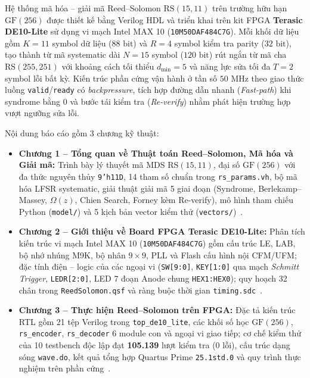 \documentclass[11pt,a4paper]{report}
\begin{document}
Hệ thống mã hóa -- giải mã Reed--Solomon $\text{RS}(15,11)$ trên trường hữu hạn $\text{GF}(256)$ được thiết kế bằng Verilog HDL và triển khai trên kit FPGA \textbf{Terasic DE10-Lite} sử dụng vi mạch Intel MAX 10 (\texttt{10M50DAF484C7G}). Mỗi khối dữ liệu gồm $K = 11$ symbol dữ liệu ($88\text{ bit}$) và $R = 4$ symbol kiểm tra parity ($32\text{ bit}$), tạo thành từ mã systematic dài $N = 15$ symbol ($120\text{ bit}$) rút ngắn từ mã cha $\text{RS}(255,251)$ với khoảng cách tối thiểu $d_{\min} = 5$ và năng lực sửa tối đa $T = 2$ symbol lỗi bất kỳ. Kiến trúc phần cứng vận hành ở tần số $50\text{ MHz}$ theo giao thức luồng \texttt{valid}/\texttt{ready} có \textit{backpressure}, tích hợp đường dẫn nhanh (\textit{Fast-path}) khi syndrome bằng 0 và bước tái kiểm tra (\textit{Re-verify}) nhằm phát hiện trường hợp vượt ngưỡng sửa lỗi.

Nội dung báo cáo gồm 3 chương kỹ thuật:
\begin{itemize}
    \item \textbf{Chương 1 -- Tổng quan về Thuật toán Reed--Solomon, Mã hóa và Giải mã:} Trình bày lý thuyết mã MDS $\text{RS}(15,11)$, đại số $\text{GF}(256)$ với đa thức nguyên thủy \texttt{9'h11D}, 14 tham số chuẩn trong \texttt{rs\_params.vh}, bộ mã hóa LFSR systematic, giải thuật giải mã 5 giai đoạn (Syndrome, Berlekamp--Massey, $\Omega(z)$, Chien Search, Forney kèm Re-verify), mô hình tham chiếu Python (\texttt{model/}) và 5 kịch bản vector kiểm thử (\texttt{vectors/})~\cite{reed1960,lincostello2004,morelos2006}.
    \item \textbf{Chương 2 -- Giới thiệu về Board FPGA Terasic DE10-Lite:} Phân tích kiến trúc vi mạch Intel MAX 10 (\texttt{10M50DAF484C7G}) gồm cấu trúc LE, LAB, bộ nhớ nhúng M9K, bộ nhân $9\times 9$, PLL và Flash cấu hình nội CFM/UFM; đặc tính điện -- logic của các ngoại vi (\texttt{SW[9:0]}, \texttt{KEY[1:0]} qua mạch \textit{Schmitt Trigger}, \texttt{LEDR[2:0]}, LED 7 đoạn Anode chung \texttt{HEX1:HEX0}); quy hoạch 32 chân trong \texttt{ReedSolomon.qsf} và ràng buộc thời gian \texttt{timing.sdc}~\cite{intelmax10,de10lite}.
    \item \textbf{Chương 3 -- Thực hiện Reed--Solomon trên FPGA:} Đặc tả kiến trúc RTL gồm 21 tệp Verilog trong \texttt{top\_de10\_lite}, các khối số học $\text{GF}(256)$, \texttt{rs\_encoder}, \texttt{rs\_decoder} 6 module con và ngoại vi giao tiếp; cơ chế kiểm thử của 10 testbench độc lập đạt \textbf{105.139} lượt kiểm tra ($0$ lỗi), cấu trúc dạng sóng \texttt{wave.do}, kết quả tổng hợp Quartus Prime \texttt{25.1std.0} và quy trình thực nghiệm trên phần cứng~\cite{quartussta,mathworksrs}.
\end{itemize}
\end{document}
